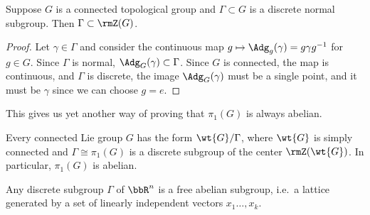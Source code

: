 \begin{prop}\label{prop discrete normal subgroup}
    Suppose $G$ is a connected topological group and $\Gamma\subset G$ is a discrete normal subgroup. Then $\Gamma\subset \rmZ(G)$.
\end{prop}
\begin{proof}
    Let $\gamma\in\Gamma$ and consider the continuous map $g\mapsto \Adg_g(\gamma)=g\gamma g^{-1}$ for $g\in G$. Since $\Gamma$ is normal, $\Adg_G(\gamma)\subset \Gamma$. Since $G$ is connected, the map is continuous, and $\Gamma$ is discrete, the image $\Adg_G(\gamma)$ must be a single point, and it must be $\gamma$ since we can choose $g=e$.
\end{proof}
This gives us yet another way of proving that $\pi_1(G)$ is always abelian.
\begin{cor}\label{cor G=wt G/Gamma}
    Every connected Lie group $G$ has the form $\wt{G}\slash\Gamma$, where $\wt{G}$ is simply connected and $\Gamma\cong \pi_1(G)$ is a discrete subgroup of the center $\rmZ(\wt{G})$. In particular, $\pi_1(G)$ is abelian.
\end{cor}
\begin{cor}\label{cor discrete subgroups of Rn}
    Any discrete subgroup $\Gamma$ of $\bbR^n$ is a free abelian subgroup, i.e.~a lattice generated by a set of linearly independent vectors $x_1\ldots,x_k$.
\end{cor}
